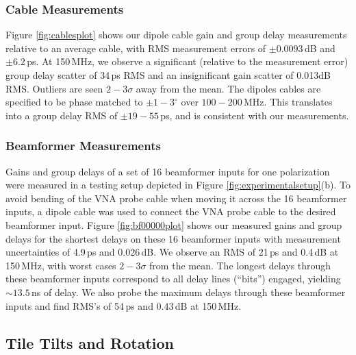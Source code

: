 \subsubsection{Cable Measurements}
\label{sec:cablemeasurements}

Figure \ref{fig:cablesplot} shows our dipole cable gain and group delay measurements relative to an average cable, with RMS measurement errors of $\pm0.0093$\,dB and $\pm6.2$\,ps. At 150\,MHz, we observe a significant (relative to the measurement error) group delay scatter of 34\,ps RMS and an insignificant gain scatter of 0.013dB RMS. Outliers are seen $2-3\sigma$ away from the mean. The dipoles cables are specified to be phase matched to $\pm1-3^\circ$ over $100-200$\,MHz. This translates into a group delay RMS of $\pm19-55$\,ps, and is consistent with our measurements.

\subsubsection{Beamformer Measurements}
\label{sec:bfmeasurements}

Gains and group delays of a set of 16 beamformer inputs for one polarization were measured in a testing setup depicted in Figure \ref{fig:experimentalsetup}(b). To avoid bending of the VNA probe cable when moving it across the 16 beamformer inputs, a dipole cable was used to connect the VNA probe cable to the desired beamformer input. Figure \ref{fig:bf00000plot} shows our measured gains and group delays for the shortest delays on these 16 beamformer inputs with measurement uncertainties of 4.9\,ps and 0.026\,dB. We observe an RMS of 21\,ps and 0.4\,dB at 150\,MHz, with worst cases $2-3\sigma$ from the mean. The longest delays through these beamformer inputs correspond to all delay lines (``bits'') engaged, yielding $\sim13.5$\,ns of delay. We also probe the maximum delays through these beamformer inputs and find RMS's of 54\,ps and 0.43\,dB at 150\,MHz.

\subsection{Tile Tilts and Rotation}

